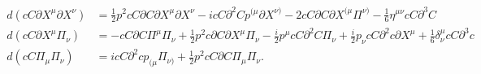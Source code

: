 \documentclass[11pt,reqno,a4paper,final]{amsart}
\theoremstyle{plain}
\theoremstyle{definition}
\renewcommand{\d}{\partial}
\newcommand{\1}{\mathbb{1}}
\numberwithin{equation}{section}
\begin{document}
\begin{appendices}
\begin{align}
\begin{split}
  \end{split}\\[1ex]
  \begin{split} \label{eq:d-on-tensors-gh-no-2}
    d(c C \d X^\mu \d X^\nu) &= \tfrac12 p^2 c C \d C \d X^\mu \d X^\nu - i c C \d^2 C p^{(\mu} \d X^{\nu)} - 2 c C \d C \d X^{(\mu} \Pi^{\nu)} - \tfrac16 \eta^{\mu\nu} c C \d^3 C\\
    d(c C \d X^\mu \Pi_\nu) &= -c C \d C \Pi^\mu \Pi_\nu + \tfrac12 p^2 c \d C \d X^\mu \Pi_\nu - \tfrac{i}2 p^\mu c C \d^2 C \Pi_\nu + \tfrac{i}2 p_\nu c C \d^2 c \d X^\mu + \tfrac16 \delta^\mu_\nu c C \d^3 c\\
    d(c C \Pi_\mu \Pi_\nu) &= i c C \d^2 c p_{(\mu} \Pi_{\nu)} + \tfrac12 p^2 c C \d C \Pi_\mu \Pi_\nu.
  \end{split}
\end{align}


\end{appendices}
\end{document}
